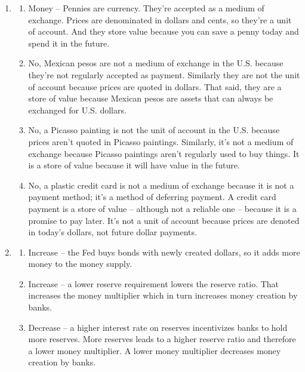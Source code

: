 \documentclass{article}
\begin{document}
\begin{enumerate}

\item

	\begin{enumerate}
	
	\item Money -- Pennies are currency. They're accepted as a medium of exchange. Prices are denominated in dollars and cents, so they're a unit of account. And they store value because you can save a penny today and spend it in the future. 
	
	\item No, Mexican pesos are not a medium of exchange in the U.S. because they're not regularly accepted as payment. Similarly they are not the unit of account because prices are quoted in dollars. That said, they are a store of value because Mexican pesos are assets that can always be exchanged for U.S. dollars.
	
	\item No, a Picasso painting is not the unit of account in the U.S. because prices aren't quoted in Picasso paintings. Similarly, it's not a medium of exchange because Picasso paintings aren't regularly used to buy things. It is a store of value because it will have value in the future.
	
	\item No, a plastic credit card is not a medium of exchange because it is not a payment method; it’s a method of deferring payment. A credit card payment is a store of value -- although not a reliable one -- because it is a promise to pay later. It’s not a unit of account because prices are denoted in today's dollars, not future dollar payments.
	
	\end{enumerate}
	
\item

	\begin{enumerate}
	
	\item Increase -- the Fed buys bonds with newly created dollars, so it adds more money to the money supply.
	
	\item Increase -- a lower reserve requirement lowers the reserve ratio. That increases the money multiplier which in turn increases money creation by banks.
	
	\item Decrease -- a higher interest rate on reserves incentivizes banks to hold more reserves. More reserves leads to a higher reserve ratio and therefore a lower money multiplier. A lower money multiplier decreases money creation by banks.
	

\end{enumerate}
\end{enumerate}
\end{document}
